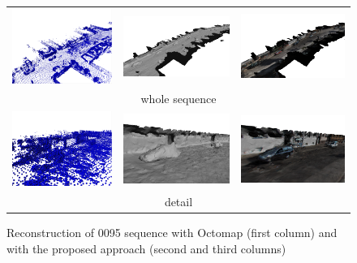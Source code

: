 \begin{figure}[tb]
 \centering
\setlength{\tabcolsep}{2px}
    \begin{tabular}{ccc}
    \includegraphics[width=0.28\columnwidth]{./img/ch-laser/octo06}&
    \includegraphics[width=0.28\columnwidth]{./img/ch-laser/proposed0600}&
    \includegraphics[width=0.28\columnwidth]{./img/ch-laser/proposed0601}\\
    \multicolumn{3}{c}{whole sequence}\\
    \includegraphics[width=0.28\columnwidth]{./img/ch-laser/octo05}&
    \includegraphics[width=0.28\columnwidth]{./img/ch-laser/proposed0501}&
    \includegraphics[width=0.28\columnwidth]{./img/ch-laser/proposed0500}\\
    \multicolumn{3}{c}{detail}
 \end{tabular}
 \caption{Reconstruction of 0095 sequence with Octomap (first column) and with the proposed approach (second and third columns)}
 \label{fig:resultOcto01}
\end{figure}



